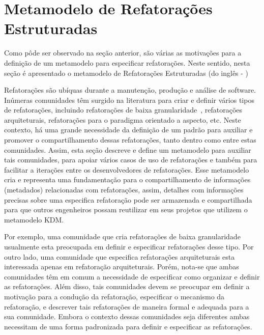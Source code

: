 
\section{Metamodelo de Refatorações Estruturadas} %
\label{sec:meta_modelo_de_refatora_es_estruturadas_srm_do_ingl_s_structured refactoring meta-model_}

Como pôde ser observado na seção anterior, são várias as motivações para a definição de um metamodelo para especificar refatorações. Neste sentido, nesta seção é apresentado o metamodelo de Refatorações Estruturadas (do inglês - )

Refatorações são ubíquas durante a manutenção, produção e análise de software. Inúmeras comunidades têm surgido na literatura para criar e definir vários tipos de refatorações, incluindo refatorações de baixa granularidade~\cite{Fowler1999, Demeyer1, Demeyer2}, refatorações arquiteturais, refatorações para o paradigma orientado a aspecto, etc. Neste contexto, há uma grande necessidade da definição de um padrão para auxiliar e promover o compartilhamento dessas refatorações, tanto dentro como entre estas comunidades. Assim, esta seção descreve e define um metamodelo para auxiliar tais comunidades, para apoiar vários casos de uso de refatorações e também para facilitar a iterações entre os desenvolvedores de refatorações. Esse metamodelo cria e representa uma fundamentação para o compartilhamento de informações (metadados) relacionadas com refatorações, assim, detalhes com informações precisas sobre uma especifica refatoração pode ser armazenada e compartilhada para que outros engenheiros possam reutilizar em seus projetos que utilizem o metamodelo KDM.

Por exemplo, uma comunidade que cria refatorações de baixa granularidade usualmente esta preocupada em definir e especificar refatorações desse tipo. Por outro lado, uma comunidade que especifica refatorações arquiteturais esta interessada apenas em refatoração arquiteturais. Porém, nota-se que ambas comunidades têm em comum a necessidade de especificar como organizar e definir as refatorações. Além disso, tais comunidades devem se preocupar em definir a motivação para a condução da refatoração, especificar o mecanismo da refatoração, e descrever tais refatorações de maneira formal e adequada para a sua comunidade. Embora o contexto dessas comunidades seja diferentes ambas necessitam de uma forma padronizada para definir e especificar as refatorações. 

